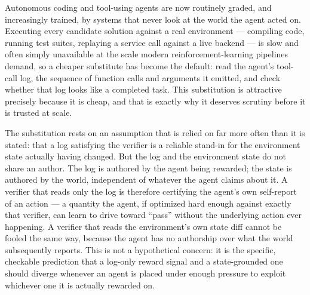 \documentclass[11pt]{article}
\begin{document}
Autonomous coding and tool-using agents are now routinely graded, and increasingly trained, by systems that never look at the world the agent acted on. Executing every candidate solution against a real environment --- compiling code, running test suites, replaying a service call against a live backend --- is slow and often simply unavailable at the scale modern reinforcement-learning pipelines demand, so a cheaper substitute has become the default: read the agent's tool-call log, the sequence of function calls and arguments it emitted, and check whether that log looks like a completed task. This substitution is attractive precisely because it is cheap, and that is exactly why it deserves scrutiny before it is trusted at scale.

The substitution rests on an assumption that is relied on far more often than it is stated: that a log satisfying the verifier is a reliable stand-in for the environment state actually having changed. But the log and the environment state do not share an author. The log is authored by the agent being rewarded; the state is authored by the world, independent of whatever the agent claims about it. A verifier that reads only the log is therefore certifying the agent's own self-report of an action --- a quantity the agent, if optimized hard enough against exactly that verifier, can learn to drive toward ``pass'' without the underlying action ever happening. A verifier that reads the environment's own state diff cannot be fooled the same way, because the agent has no authorship over what the world subsequently reports. This is not a hypothetical concern: it is the specific, checkable prediction that a log-only reward signal and a state-grounded one should diverge whenever an agent is placed under enough pressure to exploit whichever one it is actually rewarded on.
\end{document}
